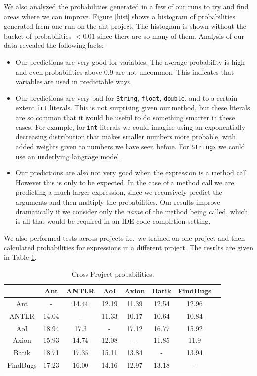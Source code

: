 \documentclass{article} %
\begin{document}
We also analyzed the probabilities generated in a few of our runs to try and find areas where we can improve. Figure \ref{hist} shows a histogram of probabilities generated from one run on the ant project. The histogram is shown without the bucket of probabilities $< 0.01$ since there are so many of them. Analysis of our data revealed the following facts:

\begin{itemize}
  \item Our predictions are very good for variables. The average probability is high and even probabilities above 0.9 are not uncommon. This indicates that variables are used in predictable ways.
  \item Our predictions are very bad for \texttt{String}, \texttt{float}, \texttt{double}, and to a certain extent \texttt{int} literals. This is not surprising given our method, but these literals are so common that it would be useful to do something smarter in these cases. For example, for \texttt{int} literals we could imagine using an exponentially decreasing distribution that makes smaller numbers more probable, with added weights given to numbers we have seen before. For \texttt{Strings} we could use an underlying language model.
  \item Our predictions are also not very good when the expression is a method call. However this is only to be expected. In the case of a method call we are predicting a much larger expression, since we recursively predict the arguments and then multiply the probabilities. Our results improve dramatically if we consider only the \emph{name} of the method being called, which is all that would be required in an IDE code completion setting.
\end{itemize}

We also performed tests across projects i.e.\ we trained on one project and then calculated probabilities for expressions in a different project. The results are given in Table \ref{tab:cross}.

\begin{table}[h]
\centering
\begin{tabular}{|c|c|c|c|c|c|c|c|}
\hline
           & Ant   & ANTLR & AoI   & Axion & Batik & FindBugs \\
\hline
 Ant       & -     & 14.44 & 12.19 & 11.39 & 12.54 & 12.96    \\
ANTLR      & 14.04 & -     & 11.33 & 10.17 & 10.64 & 10.84    \\
AoI        & 18.94 & 17.3  & -     & 17.12 & 16.77 & 15.92    \\
Axion      & 15.93 & 14.74 & 12.08 & -     & 11.85 & 11.9     \\
Batik      & 18.71 & 17.35 & 15.11 & 13.84 & -     & 13.94    \\
FindBugs   & 17.23 & 16.00 & 14.16 & 12.97 & 13.18 & -        \\
\hline
\end{tabular}
\caption{Cross Project probabilities.}
\label{tab:cross}
\end{table}
\end{document}

